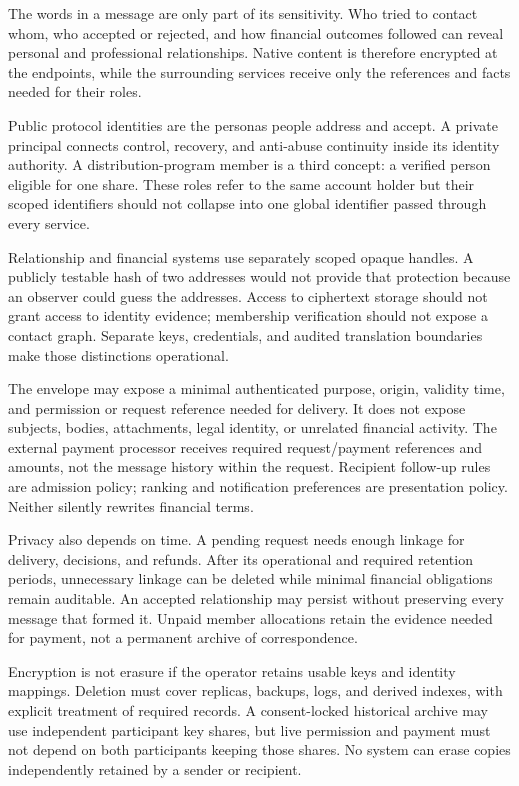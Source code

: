 \documentclass[11pt]{article}
\begin{document}
The words in a message are only part of its sensitivity. Who tried to contact
whom, who accepted or rejected, and how financial outcomes followed can reveal
personal and professional relationships. Native content is therefore encrypted
at the endpoints, while the surrounding services receive only the references
and facts needed for their roles.

Public protocol identities are the personas people address and accept. A private
principal connects control, recovery, and anti-abuse continuity inside its
identity authority. A distribution-program member is a third concept: a verified
person eligible for one share. These roles refer to the same account holder but
their scoped identifiers should not collapse into one
global identifier passed through every service.

Relationship and financial systems use separately scoped opaque handles. A
publicly testable hash of two addresses would not provide that protection because
an observer could guess the addresses. Access to ciphertext storage should not
grant access to identity evidence; membership verification should not expose a
contact graph. Separate keys, credentials, and audited translation boundaries
make those distinctions operational.

The envelope may expose a minimal authenticated purpose, origin, validity time,
and permission or request reference needed for delivery. It does not expose
subjects, bodies, attachments, legal identity, or unrelated financial activity.
The external payment processor receives required request/payment references and
amounts, not the message history within the request. Recipient follow-up rules
are admission policy; ranking and notification preferences are presentation
policy. Neither silently rewrites financial terms.

Privacy also depends on time. A pending request needs enough linkage for delivery,
decisions, and refunds. After its operational and required retention periods,
unnecessary linkage can be deleted while minimal financial obligations remain
auditable. An accepted relationship may persist without preserving every message
that formed it. Unpaid member allocations retain the evidence needed for payment,
not a permanent archive of correspondence.

Encryption is not erasure if the operator retains usable keys and identity
mappings. Deletion must cover replicas, backups, logs, and derived indexes, with
explicit treatment of required records. A consent-locked historical archive may
use independent participant key shares, but live permission and payment must not
depend on both participants keeping those shares. No system can erase copies
independently retained by a sender or recipient.
\end{document}
